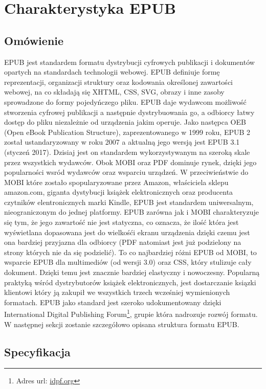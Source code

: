 \chapter{Charakterystyka EPUB}

\section{Omówienie}

EPUB jest standardem formatu dystrybucji cyfrowych publikacji i dokumentów opartych na standardach technologii webowej. EPUB definiuje
formę reprezentacji, organizacji struktury oraz kodowania określonej zawartości webowej, na co składają się XHTML, CSS, SVG, obrazy i
inne zasoby sprowadzone do formy pojedyńczego pliku. EPUB daje wydawcom możliwość stworzenia cyfrowej publikacji a następnie dystrybuowania
go, a odbiorcy łatwy dostęp do pliku niezależnie od urządzenia jakim operuje. Jako następca OEB (Open eBook Publication Structure),
zaprezentowanego w 1999 roku, EPUB 2 został ustandaryzowany w roku 2007 a aktualną jego wersją jest EPUB 3.1 (styczeń 2017). Dzisiaj jest
on standardem wykorzystywanym na szeroką skale przez wszystkich wydawców. Obok MOBI oraz PDF dominuje rynek, dzięki jego popularności
wsród wydawców oraz wsparciu urządzeń. W przeciwieństwie do MOBI które zostało spopularyzowane przez Amazon, właściciela sklepu amazon.com,
giganta dystybucji książek elektronicznych oraz producenta czytników elentronicznych marki Kindle, EPUB jest
standardem uniwersalnym, nieograniczonym do jednej platformy. EPUB zarówna jak i MOBI charakteryzuje się tym, że jego zawartość nie jest
statyczna, co oznacza, że ilość która jest wyświetlana dopasowana jest do wielkośći ekranu urządzenia dzięki czemu jest ona bardziej
przyjazna dla odbiorcy (PDF natomiast jest już podzielony na strony których nie da się podzielić). To co najbardziej różni EPUB od MOBI,
to wsparcie EPUB dla multimediów (od wersji 3.0) oraz CSS, który stulizuje cały dokument. Dzięki temu jest znacznie bardziej
elastyczny i nowoczesny. Popularną praktyką wśród dystrybutorów książek elektronicznych, jest dostarczanie ksiązki klientowi który ją
zakupił we wszystkich trzech wcześniej wymienionych formatach. EPUB jako standard jest szeroko udokumentowany dzięki International Digital
Publishing Forum\footnote{Adres url: \href{idpf.org}{idpf.org}}, grupie która nadrozuje rozwój formatu. W następnej sekcji zostanie
szczegółowo opisana struktura formatu EPUB.

\section{Specyfikacja}

